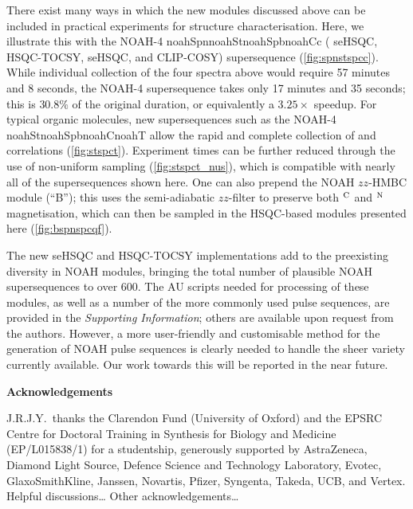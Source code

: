 \documentclass[11pt]{article}
\newcommand*{\noahfour}[4]{\csname noah#1\endcsname\csname noah#2\endcsname\csname noah#3\endcsname\csname noah#4\endcsname}
\newcommand*{\noahB}{B}
\newcommand*{\hl}[1]{\textcolor{WildStrawberry}{#1}}
\newcommand*{\carbon}{\ce{^{13}C}}
\newcommand*{\nitrogen}{\ce{^{15}N}}
\newcommand*{\magn}[1]{\ce{^1H}$^{#1}$}
\newcommand*{\SInf}{\textit{Supporting Information}}
\begin{document}
There exist many ways in which the new modules discussed above can be included in practical experiments for structure characterisation.
Here, we illustrate this with the NOAH-4 \noahfour{Spn}{St}{Spb}{Cc} (\nitrogen{} seHSQC, \carbon{} HSQC-TOCSY, \carbon{} seHSQC, and CLIP-COSY) supersequence (\cref{fig:spnstspcc}).
While individual collection of the four spectra above would require 57 minutes and 8 seconds, the NOAH-4 supersequence takes only 17 minutes and 35 seconds; this is $30.8\%$ of the original duration, or equivalently a $3.25\times$ speedup.
For typical organic molecules, new supersequences such as the NOAH-4 \noahfour{St}{Spb}{C}{T} allow the rapid and complete collection of  and  correlations (\cref{fig:stspct}).
Experiment times can be further reduced through the use of non-uniform sampling (\cref{fig:stspct_nus}), which is compatible with nearly all of the supersequences shown here.
One can also prepend the NOAH $zz$-HMBC module (``\noahB{}'');\autocite{Kupce2019JMR} this uses the semi-adiabatic $zz$-filter to preserve both \magn{\ce{C}} and \magn{\ce{N}} magnetisation, which can then be sampled in the HSQC-based modules presented here (\cref{fig:bspnspcqf}).



The new seHSQC and HSQC-TOCSY implementations add to the preexisting diversity in NOAH modules, bringing the total number of plausible NOAH supersequences to over 600.
The AU scripts needed for processing of these modules, as well as a number of the more commonly used pulse sequences, are provided in the \SInf{}; others are available upon request from the authors.
However, a more user-friendly and customisable method for the generation of NOAH pulse sequences is clearly needed to handle the sheer variety currently available.
Our work towards this will be reported in the near future.



\textbf{\Large Acknowledgements}

J.R.J.Y.\ thanks the Clarendon Fund (University of Oxford) and the EPSRC Centre for Doctoral Training in Synthesis for Biology and Medicine (EP/L015838/1) for a studentship, generously supported by AstraZeneca, Diamond Light Source, Defence Science and Technology Laboratory, Evotec, GlaxoSmithKline, Janssen, Novartis, Pfizer, Syngenta, Takeda, UCB, and Vertex.
\hl{Helpful discussions\ldots}
\hl{Other acknowledgements\ldots}


\printbibliography

\end{document}
